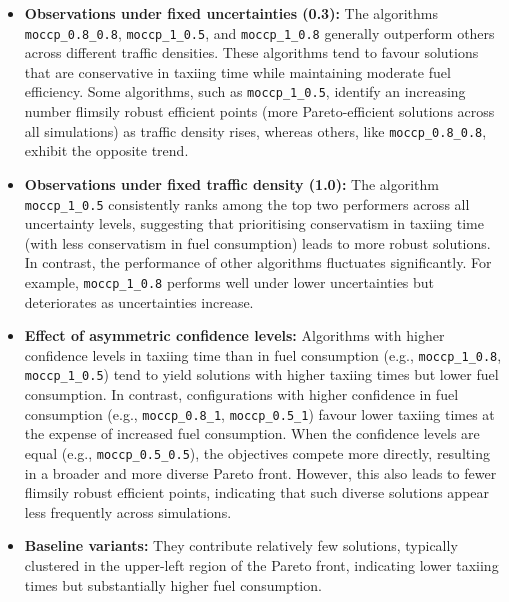 \documentclass{article}
\begin{document}
\setlength{\itemsep}{0pt}
\begin{itemize}
    \item \textbf{Observations under fixed uncertainties (0.3):} The algorithms \texttt{moccp\_0.8\_0.8}, \texttt{moccp\_1\_0.5}, and \texttt{moccp\_1\_0.8} generally outperform others across different traffic densities. These algorithms tend to favour solutions that are conservative in taxiing time while maintaining moderate fuel efficiency. Some algorithms, such as \texttt{moccp\_1\_0.5}, identify an increasing number flimsily robust efficient points (more Pareto-efficient solutions across all simulations) as traffic density rises, whereas others, like \texttt{moccp\_0.8\_0.8}, exhibit the opposite trend.
    
    \item \textbf{Observations under fixed traffic density (1.0):} The algorithm \texttt{moccp\_1\_0.5} consistently ranks among the top two performers across all uncertainty levels, suggesting that prioritising conservatism in taxiing time (with less conservatism in fuel consumption) leads to more robust solutions. In contrast, the performance of other algorithms fluctuates significantly. For example, \texttt{moccp\_1\_0.8} performs well under lower uncertainties but deteriorates as uncertainties increase.
    
    \item \textbf{Effect of asymmetric confidence levels:} Algorithms with higher confidence levels in taxiing time than in fuel consumption (e.g., \texttt{moccp\_1\_0.8}, \texttt{moccp\_1\_0.5}) tend to yield solutions with higher taxiing times but lower fuel consumption. In contrast, configurations with higher confidence in fuel consumption (e.g., \texttt{moccp\_0.8\_1}, \texttt{moccp\_0.5\_1}) favour lower taxiing times at the expense of increased fuel consumption. When the confidence levels are equal (e.g., \texttt{moccp\_0.5\_0.5}), the objectives compete more directly, resulting in a broader and more diverse Pareto front. However, this also leads to fewer flimsily robust efficient points, indicating that such diverse solutions appear less frequently across simulations.
    
    \item \textbf{Baseline variants:} They contribute relatively few solutions, typically clustered in the upper-left region of the Pareto front, indicating lower taxiing times but substantially higher fuel consumption.
\end{itemize}
\end{document}
